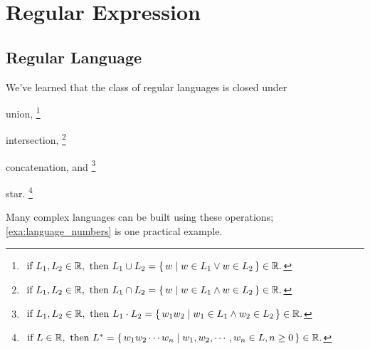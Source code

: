 

\section{Regular Expression}

\subsection{Regular Language}

We've learned that the class of regular languages is closed under
\begin{compactitem}
\item union,
    \footnote{
        $
        \text{ if } L_1, L_2 \in \mathbb R,
        \text{ then }
        L_1 \cup L_2 = { \left\{\, w \mid w \in L_1 \lor w \in L_2 \,\right\} }
        \in \mathbb R
        .$
    }
\item intersection,
    \footnote{
        $
        \text{ if } L_1, L_2 \in \mathbb R,
        \text{ then }
        L_1 \cap L_2 = { \left\{\, w \mid w \in L_1 \land w \in L_2 \,\right\} }
        \in \mathbb R
        .$
    }
\item concatenation, and
    \footnote{
        $
        \text{ if } L_1, L_2 \in \mathbb R,
        \text{ then }
        L_1 \cdot L_2 = { \left\{\, w_1w_2 \mid w_1 \in L_1 \land w_2 \in L_2 \,\right\} }
        \in \mathbb R
        .$
    }
\item star.
    \footnote{
        $
        \text{ if } L \in \mathbb R,
        \text{ then }
        L^* = { \left\{\, w_1w_2 \cdots w_n \mid w_1,w_2,\cdots,w_n \in L, n \ge 0 \,\right\} }
        \in \mathbb R
        .$
    }
\end{compactitem}

Many complex languages can be built using these operations; \autoref{exa:language_numbers}
is one practical example.

